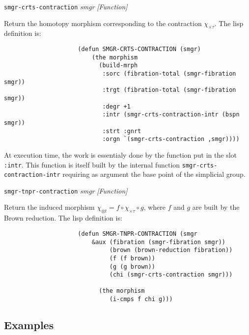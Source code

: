 {\parindent=0mm
{\leftskip=5mm 
{\tt smgr-crts-contraction} {\em smgr} \hfill {\em [Function]} \par}
{\leftskip=15mm 
Return the homotopy morphism corresponding to the contraction
$\chi_{\times\tau}$. The lisp definition is:
{\footnotesize\begin{verbatim}
                     (defun SMGR-CRTS-CONTRACTION (smgr)
                         (the morphism
                           (build-mrph
                            :sorc (fibration-total (smgr-fibration smgr))
                            :trgt (fibration-total (smgr-fibration smgr))
                            :degr +1
                            :intr (smgr-crts-contraction-intr (bspn smgr))
                            :strt :gnrt
                            :orgn `(smgr-crts-contraction ,smgr))))
\end{verbatim}}
At execution time, the work is essentialy done by the function put in the
slot {\tt :intr}. This function is itself built by the internal function {\tt smgr-crts-contraction-intr}
requiring as argument the base point of the  simplicial group. \par}
{\leftskip=5mm 
{\tt smgr-tnpr-contraction} {\em smgr} \hfill {\em [Function]} \par}
{\leftskip=15mm 
Return the induced morphism $\chi_{\otimes t}= f \circ \chi_{\times\tau} \circ g$,
where $f$ and $g$ are built by the Brown reduction.
The lisp definition is:
{\footnotesize\begin{verbatim}
                     (defun SMGR-TNPR-CONTRACTION (smgr 
                         &aux (fibration (smgr-fibration smgr))
                              (brown (brown-reduction fibration))
                              (f (f brown))
                              (g (g brown))
                              (chi (smgr-crts-contraction smgr)))

                           (the morphism
                              (i-cmps f chi g)))
\end{verbatim}} \par} 
}

\subsection* {Examples}

